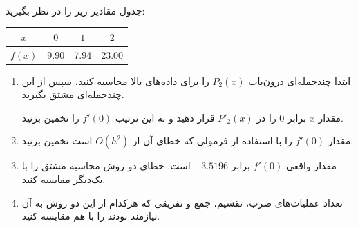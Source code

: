 \\
جدول مقادیر زیر را در نظر بگیرید:

\begin{latin}
\begin{table}[H]
  \begin{center}
    \begin{tabular}{c|c c c}
      \textbf{$x$} & $0$ & $1$ & $2$ \\
      \hline
      \textbf{$f(x)$} & 9.90 & 7.94 & 23.00 \\
    \end{tabular}
  \end{center}
\end{table}
\end{latin}

\begin{enumerate}
	\item
	ابتدا چندجمله‌ای درون‌یاب
	$P_2(x)$
	را برای داده‌های بالا محاسبه کنید،
	سپس از این چندجمله‌ای مشتق بگیرید.
	
	مقدار $x$
	برابر 0
	را در $P'_2(x)$
	قرار دهید و به این ترتیب $f'(0)$
	را تخمین بزنید.
	
	\item
	مقدار
	$f'(0)$
	را با استفاده از فرمولی که خطای آن از
	$O(h^2)$
	است تخمین بزنید.
	
	\item
	مقدار واقعی $f'(0)$
	برابر
	$-3.5196$
	است.
	خطای دو روش محاسبه مشتق را با یک‌دیگر مقایسه کنید.
	
	\item
	تعداد عملیات‌های ضرب، تقسیم، جمع و تفریقی که هرکدام از این دو روش به آن نیازمند بودند را با هم مقایسه کنید.
\end{enumerate}
